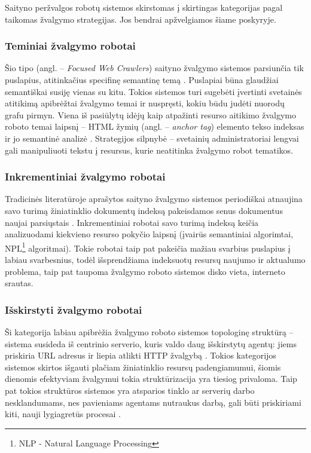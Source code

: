Saityno peržvalgos robotų sistemos skirstomas į skirtingas kategorijas pagal taikomas žvalgymo strategijas. Jos bendrai apžvelgiamos šiame poskyryje.

\subsubsection{Teminiai žvalgymo robotai}

Šio tipo (angl. -- \textit{Focused Web Crawlers}) saityno žvalgymo sistemos parsiunčia tik puslapius, atitinkačius specifinę semantinę temą \cite{CategoriesOfWebCrawlersAndOverview}. Puslapiai būna glaudžiai semantiškai susiję vienas su kitu. Tokios sistemos turi sugebėti įvertinti svetainės atitikimą apibrėžtai žvalgymo temai ir nuspręsti, kokiu būdu judėti nuorodų grafu pirmyn. Viena iš pasiūlytų idėjų kaip atpažinti resurso aitikimo žvalgymo roboto temai laipsnį -- HTML žymių (angl. -- \textit{anchor tag}) elemento tekso indeksas ir jo semantinė analizė \cite{AnchorTagsSemanticAnalysis}. Strategijos silpnybė -- svetainių administratoriai lengvai gali manipuliuoti tekstu į resursus, kurie neatitinka žvalgymo robot tematikos.


\subsubsection{Inkrementiniai žvalgymo robotai}

Tradicinės literatūroje aprašytos saityno žvalgymo sistemos periodiškai atnaujina savo turimą žiniatinklio dokumentų indeksą pakeisdamos senus dokumentus naujai parsiųstais \cite{CategoriesOfWebCrawlersAndOverview}. Inkrementiniai robotai savo turimą indeksą keičia analizuodami kiekvieno resurso pokyčio laipsnį (įvairūs semantiniai algorimtai, NPL\footnote{NLP - Natural Language Processing} algoritmai). Tokie robotai taip pat pakeičia mažiau svarbius puslapius į labiau svarbesnius, todėl išsprendžiama indeksuotų resursų naujumo ir aktualumo problema, taip pat taupoma žvalgymo roboto sistemos disko vieta, interneto srautas.

\subsubsection{Išskirstyti žvalgymo robotai}

Ši kategorija labiau apibrėžia žvalgymo roboto sistemos topologinę struktūrą -- sistema susideda iš centrinio serverio, kuris valdo daug išskirstytų agentų: jiems priskiria URL adresus ir liepia atlikti HTTP žvalgybą \cite{CategoriesOfWebCrawlersAndOverview}. Tokios kategorijos sistemos skirtos išgauti plačiam žiniatinklio resursų padengiamumui, šiomis dienomis efektyviam žvalgymui tokia struktūrizacija yra tiesiog privaloma. Taip pat tokios struktūros sistemos yra atsparios tinklo ar serverių darbo nesklandumams, nes pavieniams agentams nutraukus darbą, gali būti priskiriami kiti, nauji lygiagretūs procesai \cite{CategoriesOfWebCrawlersAndOverview}.

